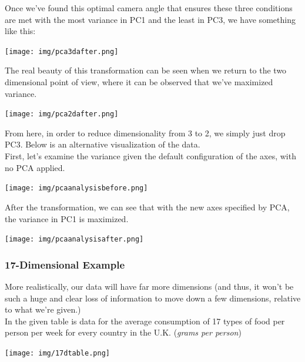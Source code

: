 \documentclass[english, 10pt]{article}
\begin{document}
Once we've found this optimal camera angle that ensures these three conditions are met with the most variance in PC1 and the least in PC3, we have something like this:\\

{
\centering

\texttt{[image: img/pca3dafter.png]} 

}

\hfill \break The real beauty of this transformation can be seen when we return to the two dimensional point of view, where it can be observed that we've maximized variance.\\

{
\centering

\texttt{[image: img/pca2dafter.png]} 

}

\hfill \break From here, in order to reduce dimensionality from 3 to 2, we simply just drop PC3. Below is an alternative visualization of the data.\\

First, let's examine the variance given the default configuration of the axes, with no PCA applied.\\


{
\centering

\texttt{[image: img/pcaanalysisbefore.png]} 

}

\hfill \break After the transformation, we can see that with the new axes specified by PCA, the variance in PC1 is maximized.\\

{
\centering

\texttt{[image: img/pcaanalysisafter.png]}

}

\subsubsection{17-Dimensional Example}

More realistically, our data will have far more dimensions (and thus, it won't be such a huge and clear loss of information to move down a few dimensions, relative to what we're given.)\\

In the given table is data for the average consumption of 17 types of food per person per week for every country in the U.K. (\textit{grams per person})\\

{
\centering

\texttt{[image: img/17dtable.png]} 

}
\end{document}
